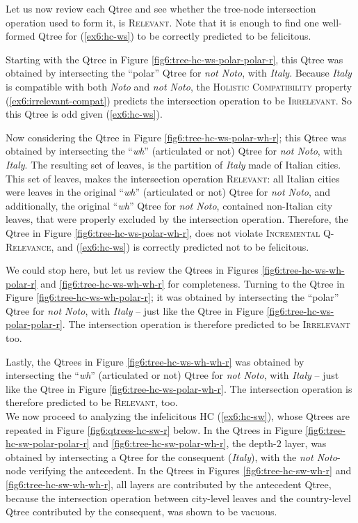 Let us now review each Qtree and see whether the tree-node intersection operation used to form it, is \textsc{Relevant}. Note that it is enough to find one well-formed Qtree for (\ref{ex6:hc-ws}) to be correctly predicted to be felicitous.

Starting with the Qtree in Figure \ref{fig6:tree-hc-ws-polar-polar-r}, this Qtree was obtained by intersecting the ``polar'' Qtree for \textit{not Noto}, with \textit{Italy}. Because \textit{Italy} is compatible with both \textit{Noto} and \textit{not Noto}, the \textsc{Holistic Compatibility} property (\ref{ex6:irrelevant-compat}) predicts the intersection operation to be \textsc{Irrelevant}. So this Qtree is odd given (\ref{ex6:hc-ws}).

Now considering the Qtree in Figure \ref{fig6:tree-hc-ws-polar-wh-r}; this Qtree was obtained by intersecting the ``\textit{wh}'' (articulated or not) Qtree for \textit{not Noto}, with \textit{Italy}. The resulting set of leaves, is the partition of \textit{Italy} made of Italian cities. This set of leaves, makes the intersection operation \textsc{Relevant}: all Italian cities were leaves in the original ``\textit{wh}'' (articulated or not) Qtree for \textit{not Noto}, and additionally, the original ``\textit{wh}'' Qtree for \textit{not Noto}, contained non-Italian city leaves, that were properly excluded by the intersection operation. Therefore, the Qtree in Figure \ref{fig6:tree-hc-ws-polar-wh-r}, does not violate \textsc{Incremental Q-Relevance}, and (\ref{ex6:hc-ws}) is correctly predicted not to be felicitous.

We could stop here, but let us review the Qtrees in Figures \ref{fig6:tree-hc-ws-wh-polar-r} and \ref{fig6:tree-hc-ws-wh-wh-r} for completeness. Turning to the Qtree in Figure \ref{fig6:tree-hc-ws-wh-polar-r}; it was obtained by intersecting the ``polar'' Qtree for \textit{not Noto}, with \textit{Italy} -- just like the Qtree in Figure \ref{fig6:tree-hc-ws-polar-polar-r}. The intersection operation is therefore predicted to be \textsc{Irrelevant} too.

Lastly, the Qtrees in Figure \ref{fig6:tree-hc-ws-wh-wh-r} was obtained by intersecting the ``\textit{wh}'' (articulated or not) Qtree for \textit{not Noto}, with \textit{Italy} -- just like the Qtree in Figure \ref{fig6:tree-hc-ws-polar-wh-r}. The intersection operation is therefore predicted to be \textsc{Relevant}, too.\\

We now proceed to analyzing the infelicitous HC (\ref{ex6:hc-sw}), whose Qtrees are repeated in Figure \ref{fig6:qtrees-hc-sw-r} below. In the Qtrees in Figure \ref{fig6:tree-hc-sw-polar-polar-r} and \ref{fig6:tree-hc-sw-polar-wh-r}, the depth-$2$ layer, was obtained by intersecting a Qtree for the consequent (\textit{Italy}), with the \textit{not Noto}-node verifying the antecedent. In the Qtrees in Figures \ref{fig6:tree-hc-sw-wh-r} and \ref{fig6:tree-hc-sw-wh-wh-r}, all layers are contributed by the antecedent Qtree, because the intersection operation between city-level leaves and the country-level Qtree contributed by the consequent, was shown to be vacuous.

